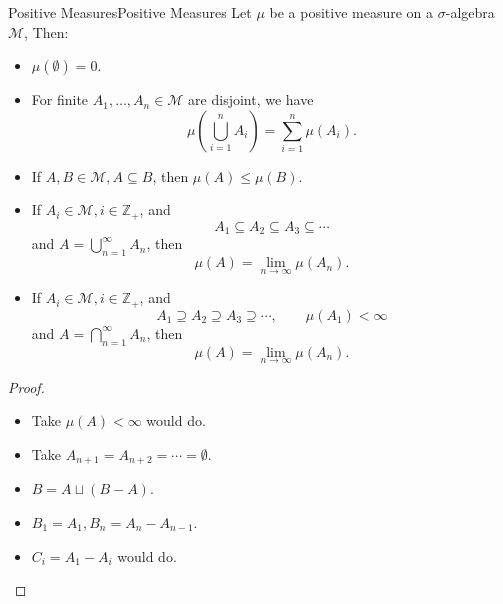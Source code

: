 \documentclass[../main.tex]{subfiles}
\begin{document}
\begin{proposition}{Positive Measures}{Positive Measures}
Let $\mu$ be a positive measure on a $\sigma$-algebra $\mathcal{M}$, Then:
\begin{itemize}
\item $\mu(\emptyset ) = 0$.
\item For finite $A_1, \ldots ,A_n\in \mathcal{M}$ are disjoint, we have
	\begin{equation*}
		\mu\left(\bigcup_{i=1}^{n} A_i\right) = \sum_{i=1}^{n} \mu(A_i).
	\end{equation*}
\item If $A,B\in \mathcal{M},A \subseteq B$, then $\mu(A) \leq \mu(B)$.
\item If $A_i\in \mathcal{M},i\in \mathbb{Z}_+$, and 
	\begin{equation*}
	A_1 \subseteq A_2 \subseteq A_3 \subseteq \cdots 
	\end{equation*}
	and $\displaystyle A = \bigcup_{n=1}^{\infty } A_n$, then
	\begin{equation*}
		\mu(A) = \lim_{n\rightarrow \infty } \mu(A_n).
	\end{equation*}
\item If $A_i\in \mathcal{M},i\in \mathbb{Z}_+$, and
	\begin{equation*}
	A_1 \supseteq A_2 \supseteq A_3 \supseteq \cdots ,\qquad \mu(A_1) < \infty
	\end{equation*}
	and $\displaystyle A = \bigcap_{n=1}^{\infty } A_n$, then
	\begin{equation*}
		\mu(A) = \lim_{n\rightarrow \infty } \mu(A_n).
	\end{equation*}
\end{itemize}
\end{proposition}
\begin{proof}
\begin{itemize}
\item Take $\mu(A) < \infty $ would do.
\item Take $A_{n+1} = A_{n+2} = \cdots = \emptyset $.
\item $B=A\sqcup (B-A)$.
\item $B_1=A_1, B_n = A_{n}-A_{n-1}$.
\item $C_i = A_1-A_i$ would do.
\end{itemize}
\end{proof}
\end{document}
